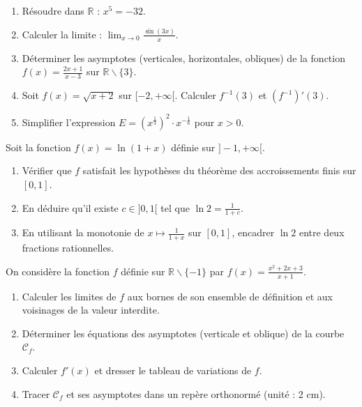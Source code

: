 \documentclass[11pt]{article}
\def\setminus{\mathbin{\backslash}}\let\smallsetminus\setminus
\begin{document}
\begin{exercice}
\begin{enumerate}
    \item Résoudre dans $\mathbb{R}$ : $x^5 = -32$.
    \item Calculer la limite : $\lim_{x\to 0}\frac{\sin(3x)}{x}$.
    \item Déterminer les asymptotes (verticales, horizontales, obliques) de la fonction $f(x)=\frac{2x+1}{x-3}$ sur $\mathbb{R}\setminus\{3\}$.
    \item Soit $f(x)=\sqrt{x+2}$ sur $[-2,+\infty[$. Calculer $f^{-1}(3)$ et $(f^{-1})'(3)$.
    \item Simplifier l'expression $E = (x^{\frac{1}{3}})^2 \cdot x^{-\frac{1}{6}}$ pour $x>0$.
\end{enumerate}
\end{exercice}

\begin{exercice}
Soit la fonction $f(x)=\ln(1+x)$ définie sur $]-1,+\infty[$.
\begin{enumerate}
    \item Vérifier que $f$ satisfait les hypothèses du théorème des accroissements finis sur $[0, 1]$.
    \item En déduire qu'il existe $c\in]0,1[$ tel que $\ln 2 = \frac{1}{1+c}$.
    \item En utilisant la monotonie de $x\mapsto \frac{1}{1+x}$ sur $[0,1]$, encadrer $\ln 2$ entre deux fractions rationnelles.
\end{enumerate}
\end{exercice}

\begin{exercice}
On considère la fonction $f$ définie sur $\mathbb{R}\setminus\{-1\}$ par $f(x)=\frac{x^2+2x+3}{x+1}$.
\begin{enumerate}
    \item Calculer les limites de $f$ aux bornes de son ensemble de définition et aux voisinages de la valeur interdite.
    \item Déterminer les équations des asymptotes (verticale et oblique) de la courbe $\mathcal{C}_f$.
    \item Calculer $f'(x)$ et dresser le tableau de variations de $f$.
    \item Tracer $\mathcal{C}_f$ et ses asymptotes dans un repère orthonormé (unité : 2 cm).
\end{enumerate}
\end{exercice}
\end{document}
